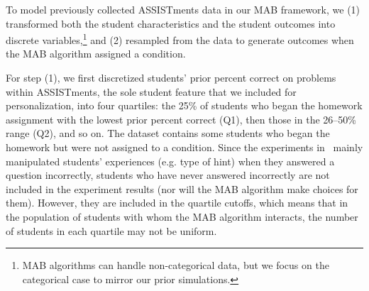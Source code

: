 To model previously collected ASSISTments data in our MAB framework, we (1) transformed both the student characteristics and the student outcomes into discrete variables,\footnote{MAB algorithms can handle non-categorical data, but we focus on the categorical case to mirror our prior simulations.} and (2) resampled from the data to generate outcomes when the MAB algorithm assigned a condition.


For step (1), we first discretized students' prior percent correct on problems within ASSISTments, the sole student feature that we included for personalization, into four quartiles: the 25\% of students who began the homework assignment with the lowest prior percent correct (Q1), then those in the 26--50\% range (Q2), and so on. The dataset contains some students who began the homework but were not assigned to a condition. Since the experiments in~\cite{selent2016assistments} mainly manipulated students' experiences (e.g. type of hint) when they answered a question incorrectly, students who have never answered incorrectly are not included in the experiment results (nor will the MAB algorithm make choices for them). However, they are included in the quartile cutoffs, which means that in the population of students with whom the MAB algorithm interacts, the number of students in each quartile may not be uniform.

